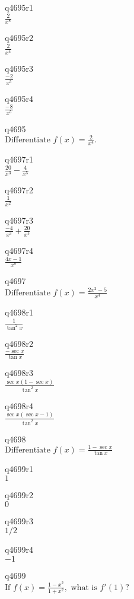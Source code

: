 q4695r1\\
\(\displaystyle \frac{2}{x^8} \)

q4695r2\\
\(\displaystyle \frac{2}{x^4} \)

q4695r3\\
\(\displaystyle \frac{-2}{x^5} \)

q4695r4\\
\(\displaystyle \frac{-8}{x^5} \)

q4695\\
\(\displaystyle \text{Differentiate } f(x) = \frac{2}{x^4}. \)

q4697r1\\
\(\displaystyle \frac{20}{x^3} - \frac{4}{x^5} \)

q4697r2\\
\(\displaystyle \frac{1}{x^2} \)

q4697r3\\
\(\displaystyle \frac{-4}{x^3} + \frac{20}{x^5} \)

q4697r4\\
\(\displaystyle \frac{4x-1}{x^8} \)

q4697\\
\(\displaystyle \text{Differentiate } f(x) = \frac{2x^2 - 5}{x^4} \)

q4698r1\\
\(\displaystyle \frac{1}{\tan^2 x} \)

q4698r2\\
\(\displaystyle \frac{-\sec x}{\tan x} \)

q4698r3\\
\(\displaystyle \frac{\sec x (1- \sec x)}{\tan^2 x} \)

q4698r4\\
\(\displaystyle \frac{\sec x (\sec x - 1)}{\tan^2 x} \)

q4698\\
\(\displaystyle \text{Differentiate } f(x) = \frac{1-\sec x}{\tan x} \)

q4699r1\\
\(\displaystyle 1 \)

q4699r2\\
\(\displaystyle 0 \)

q4699r3\\
\(\displaystyle 1/2 \)

q4699r4\\
\(\displaystyle -1 \)

q4699\\
\(\displaystyle \text{If } f(x) = \frac{1-x^2}{1+x^2}, \text{ what is } f'(1)? \)

